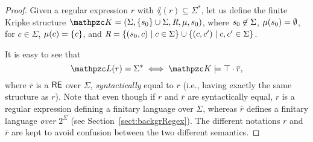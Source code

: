 \begin{proof}
    Given a regular expression $r$ with $\lang(r)\subseteq \Sigma^*$,
let us define the finite Kripke structure $\Ku=(\Sigma, \{\sinit\}\cup \Sigma, \Edges, \Lab, \sinit)$, where $s_0\not\in \Sigma$, $\mu(s_0)=\emptyset$, for $c\in\Sigma$,  $\mu(c)=\{c\}$, and $\textit{R}=\{(s_0,c)\mid c\in\Sigma\}\cup \{(c,c')\mid c,c'\in \Sigma\}$.

It is easy to see that \[\lang(r)=\Sigma^*\iff \Ku\models \top\cdot \overline{r},\]
where 
$\overline{r}$ is a $\mathsf{RE}$ over $\Sigma$, \emph{syntactically} equal to $r$
(i.e., having exactly the same structure as $r$).
%
Note that even though if $r$ and $\overline{r}$ are syntactically equal,  $r$ is a regular expression defining a finitary language over $\Sigma$, whereas $\overline{r}$ defines a finitary language \emph{over $2^\Sigma$} (see Section~\ref{sect:backgrRegex}). The different notations  $r$ and $\overline{r}$ are kept to avoid confusion between the two different semantics.



\end{proof}
